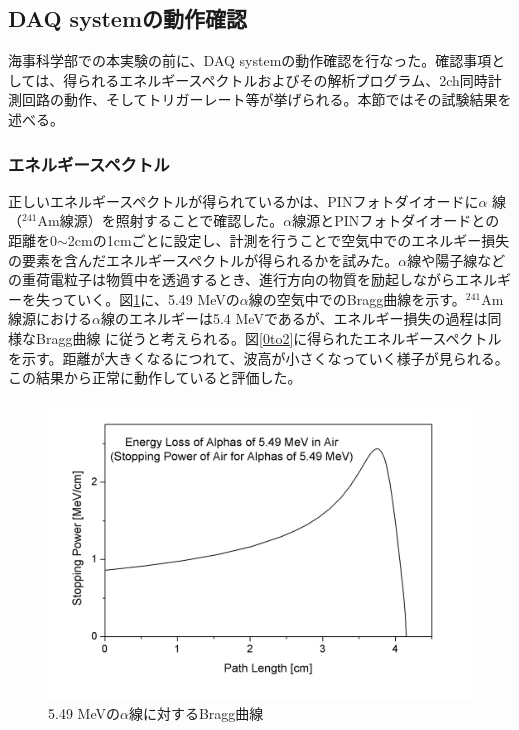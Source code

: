 \documentclass[a4paper,11pt,dvipdfmx]{jsarticle}
\begin{document}
\newpage
\subsection{DAQ systemの動作確認}
海事科学部での本実験の前に、DAQ systemの動作確認を行なった。確認事項としては、得られるエネルギースペクトルおよびその解析プログラム、2ch同時計測回路の動作、そしてトリガーレート等が挙げられる。本節ではその試験結果を述べる。

\subsubsection{エネルギースペクトル}
正しいエネルギースペクトルが得られているかは、PINフォトダイオードに$\alpha$ 線（$^{241}\mathrm{Am}$線源）を照射することで確認した。$\alpha$線源とPINフォトダイオードとの距離を0$\sim$2cmの1cmごとに設定し、計測を行うことで空気中でのエネルギー損失の要素を含んだエネルギースペクトルが得られるかを試みた。$\alpha$線や陽子線などの重荷電粒子は物質中を透過するとき、進行方向の物質を励起しながらエネルギーを失っていく。図\ref{Bragg}に、5.49 MeVの$\alpha$線の空気中でのBragg曲線を示す。$^{241}\mathrm{Am}$線源における$\alpha$線のエネルギーは5.4 MeVであるが、エネルギー損失の過程は同様なBragg曲線 に従うと考えられる。図\ref{0to2}に得られたエネルギースペクトルを示す。距離が大きくなるにつれて、波高が小さくなっていく様子が見られる。この結果から正常に動作していると評価した。\\

\begin{figure}[H]
\centering
\includegraphics[width=120mm]{picture/daq/Bragg.png}
\caption{5.49 MeVの$\alpha$線に対するBragg曲線\cite{braggpeak}}
\label{Bragg}
\end{figure}
\end{document}
